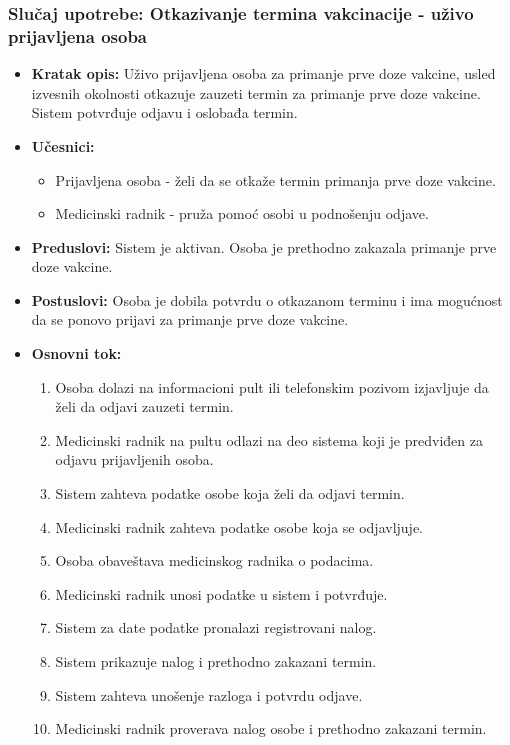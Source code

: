 \documentclass[titlepage]{article}
\begin{document}
\subsubsection{Slučaj upotrebe: Otkazivanje termina vakcinacije - uživo prijavljena osoba}
\begin{itemize}
    \item \textbf{Kratak opis:} Uživo prijavljena osoba za primanje prve doze vakcine, usled izvesnih okolnosti otkazuje zauzeti termin za primanje prve doze vakcine. Sistem potvrđuje odjavu i oslobađa termin.
    \item \textbf{Učesnici:}
        \begin{itemize}
            \item Prijavljena osoba - želi da se otkaže termin primanja prve doze vakcine.
	    \item Medicinski radnik - pruža pomoć osobi u podnošenju odjave.
        \end{itemize}
    \item \textbf{Preduslovi:} Sistem je aktivan. Osoba je prethodno zakazala primanje prve doze vakcine.
    \item \textbf{Postuslovi:} Osoba je dobila potvrdu o otkazanom terminu i ima mogućnost da se ponovo prijavi za primanje prve doze vakcine.
    \item \textbf{Osnovni tok:}
        \begin{enumerate}
            \item Osoba dolazi na informacioni pult ili telefonskim pozivom izjavljuje da želi da odjavi zauzeti termin.
	    \item Medicinski radnik na pultu odlazi na deo sistema koji je predviđen za odjavu prijavljenih osoba.
	    \item Sistem zahteva podatke osobe koja želi da odjavi termin.
	    \item Medicinski radnik zahteva podatke osobe koja se odjavljuje.
	    \item Osoba obaveštava medicinskog radnika o podacima.
	    \item Medicinski radnik unosi podatke u sistem i potvrđuje.
            \item Sistem za date podatke pronalazi registrovani nalog.
	    \item Sistem prikazuje nalog i prethodno zakazani termin.
	    \item Sistem zahteva unošenje razloga i potvrdu odjave.
	    \item Medicinski radnik proverava nalog osobe i prethodno zakazani termin.

\end{enumerate}
\end{itemize}
\end{document}
